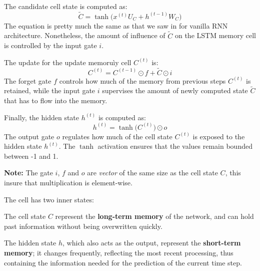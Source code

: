 \begin{infobox}
    The candidate cell state is computed as:
    \[
    \tilde{C} = \tanh\big(x^{(t)} U_C + h^{(t-1)} W_C\big)
    \]
    The equation is pretty much the same as that we saw in for vanilla RNN architecture. Nonetheless, the amount of influence of $\tilde{C}$ on the LSTM memory cell is controlled by the input gate $i$.

    The update for the update memoruìy cell $C^{(t)}$ is:
    \[
    C^{(t)} = C^{(t-1)} \odot f + \tilde{C} \odot i
    \]
    The forget gate $f$ controls  how much of the memory from previous steps $C^{(t)}$ is retained, while the input gate $i$ supervises the amount of newly computed state $\tilde{C}$ that has to flow into the memory.

    Finally, the hidden state $h^{(t)}$ is computed as:
    \[
    h^{(t)} = \tanh\big(C^{(t)}\big) \odot o
    \]
    The output gate $o$ regulates how much of the cell state $C^{(t)}$ is exposed to the hidden state $h^{(t)}$. The $\tanh$ activation ensures that the values remain bounded between -1 and 1.

    \textbf{Note:} The gate $i$, $f$ and $o$ are \emph{vector} of the same size as the cell state $C$, this insure that multiplication is element-wise. 
\end{infobox}

The cell has two inner states:
\begin{compactitemize}
    \item The cell state $C$ represent the \textbf{long-term memory} of the network, and can hold past information without being overwritten quickly.
    \item The hidden state $h$, which also acts as the output, represent the \textbf{short-term memory}; it changes frequently, reflecting the most recent processing, thus containing the information needed for the prediction of the current time step.
\end{compactitemize}


